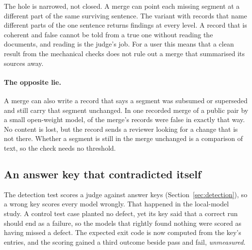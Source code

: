 The hole is narrowed, not closed. A merge can point each missing segment at a different part of the same surviving sentence. The variant with  records that name  different parts of the one sentence returns  findings at every level. A record that is coherent and false cannot be told from a true one without reading the documents, and reading is the judge's job. For a user this means that a clean result from the mechanical checks does not rule out a merge that summarised its sources away.

\paragraph{The opposite lie.}
\label{sec:false-departure}
A merge can also write a record that says a segment was subsumed or superseded and still carry that segment unchanged. In one recorded merge of a public pair by a small open-weight model,  of the merge's  records were false in exactly that way. No content is lost, but the record sends a reviewer looking for a change that is not there. Whether a segment is still in the merge unchanged is a comparison of text, so the check needs no threshold.

\subsection{An answer key that contradicted itself}
\label{sec:unmeasurable}

The detection test scores a judge against answer keys (Section~\ref{sec:detection}), so a wrong key scores every model wrongly. That happened in the local-model study. A control test case planted no defect, yet its key said that a correct run should end as a failure, so the models that rightly found nothing were scored as having missed a defect. The expected exit code is now computed from the key's entries, and the scoring gained a third outcome beside pass and fail, \emph{unmeasured}.
